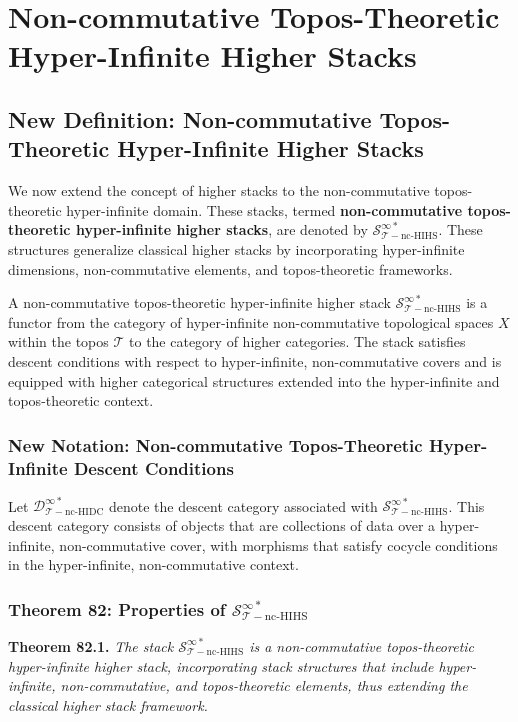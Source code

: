 \documentclass{article}
\begin{document}

\section{Non-commutative Topos-Theoretic Hyper-Infinite Higher Stacks}
\subsection{New Definition: Non-commutative Topos-Theoretic Hyper-Infinite Higher Stacks}
We now extend the concept of higher stacks to the non-commutative topos-theoretic hyper-infinite domain. These stacks, termed \textbf{non-commutative topos-theoretic hyper-infinite higher stacks}, are denoted by \(\mathcal{S}_{\mathcal{T}-\text{nc-HIHS}}^{\infty *}\). These structures generalize classical higher stacks by incorporating hyper-infinite dimensions, non-commutative elements, and topos-theoretic frameworks.

A non-commutative topos-theoretic hyper-infinite higher stack \(\mathcal{S}_{\mathcal{T}-\text{nc-HIHS}}^{\infty *}\) is a functor from the category of hyper-infinite non-commutative topological spaces \(X\) within the topos \(\mathcal{T}\) to the category of higher categories. The stack satisfies descent conditions with respect to hyper-infinite, non-commutative covers and is equipped with higher categorical structures extended into the hyper-infinite and topos-theoretic context.

\subsubsection{New Notation: Non-commutative Topos-Theoretic Hyper-Infinite Descent Conditions}
Let \(\mathcal{D}_{\mathcal{T}-\text{nc-HIDC}}^{\infty *}\) denote the descent category associated with \(\mathcal{S}_{\mathcal{T}-\text{nc-HIHS}}^{\infty *}\). This descent category consists of objects that are collections of data over a hyper-infinite, non-commutative cover, with morphisms that satisfy cocycle conditions in the hyper-infinite, non-commutative context.

\subsubsection{Theorem 82: Properties of \(\mathcal{S}_{\mathcal{T}-\text{nc-HIHS}}^{\infty *}\)}
\textbf{Theorem 82.1.} \textit{The stack \(\mathcal{S}_{\mathcal{T}-\text{nc-HIHS}}^{\infty *}\) is a non-commutative topos-theoretic hyper-infinite higher stack, incorporating stack structures that include hyper-infinite, non-commutative, and topos-theoretic elements, thus extending the classical higher stack framework.}
\end{document}
